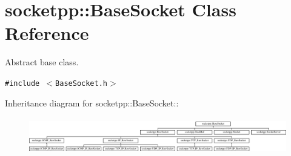 \hypertarget{classsocketpp_1_1BaseSocket}{
\section{socketpp::BaseSocket Class Reference}
\label{classsocketpp_1_1BaseSocket}
}
Abstract base class.  


{\tt \#include $<$BaseSocket.h$>$}

Inheritance diagram for socketpp::BaseSocket::\begin{figure}[H]
\begin{center}
\leavevmode
\includegraphics[height=1.64948cm]{classsocketpp_1_1BaseSocket}
\end{center}
\end{figure}
